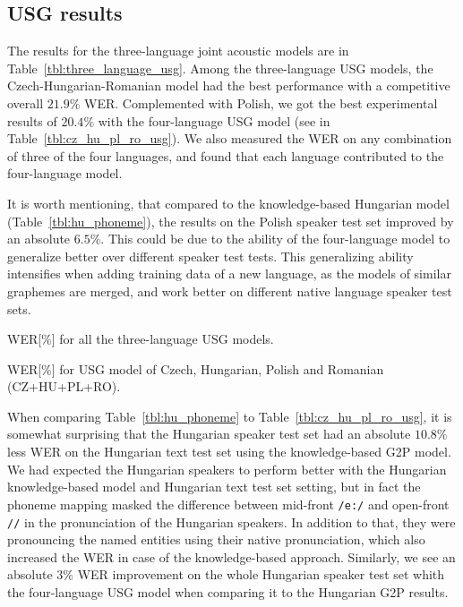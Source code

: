 \documentclass[runningheads,a4paper]{llncs}
\begin{document}
\subsection{USG results}
The results for the three-language joint acoustic models are in Table~\ref{tbl:three_language_usg}.
Among the three-language USG models, the Czech-Hungarian-Romanian model had the best performance with a competitive overall $21.9\%$ WER. 
Complemented with Polish, we got the best experimental results of $20.4\%$ with the four-language USG model (see in Table~\ref{tbl:cz_hu_pl_ro_usg}).
We also measured the WER on any combination of three of the four languages, and found that each language contributed to the four-language model.

It is worth mentioning, that compared to the knowledge-based Hungarian model (Table~\ref{tbl:hu_phoneme}), the results on the Polish speaker test set improved by an absolute $6.5\%$.
This could be due to the ability of the four-language model to generalize better over different speaker test tests.
This generalizing ability intensifies when adding training data of a new language, as the models of similar graphemes are merged, and work better on different native language speaker test sets.

\begin{table}
\parbox{.45\linewidth}{
\centering
\caption{WER[\%] for all the three-language USG models.}
\label{tbl:three_language_usg}
}
\hfill
\parbox{.45\linewidth}{
\centering
\caption{WER[\%] for USG model of Czech, Hungarian, Polish and Romanian (CZ+HU+PL+RO).}
\label{tbl:cz_hu_pl_ro_usg}
}
\end{table}

When comparing Table~\ref{tbl:hu_phoneme} to Table~\ref{tbl:cz_hu_pl_ro_usg}, it is somewhat surprising that the Hungarian speaker test set had an absolute $10.8\%$ less WER on the Hungarian text test set using the knowledge-based G2P model.
We had expected the Hungarian speakers to perform better with the Hungarian knowledge-based model and Hungarian text test set setting, but in fact the phoneme mapping masked the difference between mid-front \texttt{/e:/} and open-front \texttt{//} in the pronunciation of the Hungarian speakers.
In addition to that, they were pronouncing the named entities using their native pronunciation, which also increased the WER in case of the knowledge-based approach.
Similarly, we see an absolute $3\%$ WER improvement on the whole Hungarian speaker test set whith the four-language USG model when comparing it to the Hungarian G2P results.
\end{document}
